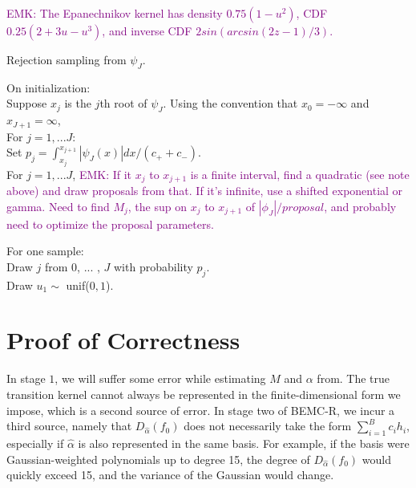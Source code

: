 \documentclass{article}
\newcommand\EMK[1]{\textcolor{purple}{EMK: #1}}
\begin{document}
\EMK{The Epanechnikov kernel has density $0.75(1−u^2)$, CDF $0.25(2+3u−u^3)$, and inverse CDF $2sin(arcsin(2z-1)/3)$.}

\begin{algorithm}[h]
\caption{Rejection sampling from $\psi_{J}$.} 
On initialization:\\
\Indp
Suppose $x_{j}$ is the $j$th root of $\psi_{J}$. Using the convention that $x_{0}=-\infty$ and $x_{J+1}=\infty$, \\
For $j=1,...J$:\\
\Indp
Set $p_j=\int_{x_{j}}^{x_{j+1}}|\psi_{J}(x)|dx/(c_+ + c_-)$.\\
For $j=1,...J$, 
\Indp
\EMK{If it $x_{j}$ to $x_{j+1}$ is a finite interval, find a quadratic (see note above) and draw proposals from that. If it's infinite, use a shifted exponential or gamma. Need to find $M_j$, the sup on $x_{j}$ to $x_{j+1}$ of $|\phi_J|/proposal$, and probably need to optimize the proposal parameters.\\}
\Indm
\Indm
\Indm

For one sample:\\
Draw $j$ from $0$, ... , $J$ with probability $p_j$.\\
Draw $u_1\sim$ unif($0,1$). \\

\end{algorithm}


\section{Proof of Correctness}
In stage $1$, we will suffer some error while estimating $M$ and $\alpha$ from. The true transition kernel cannot always be represented in the finite-dimensional form we impose, which is a second source of error. In stage two of BEMC-R, we incur a third source, namely that $D_{\hat{\alpha}}(f_0)$ does not necessarily take the form $\sum_{i=1}^B c_i h_i$, especially if $\hat{\alpha}$ is also represented in the same basis. For example, if the basis were Gaussian-weighted polynomials up to degree 15, the degree of $D_{\hat{\alpha}}(f_0)$ would quickly exceed 15, and the variance of the Gaussian would change. 



\end{document}
